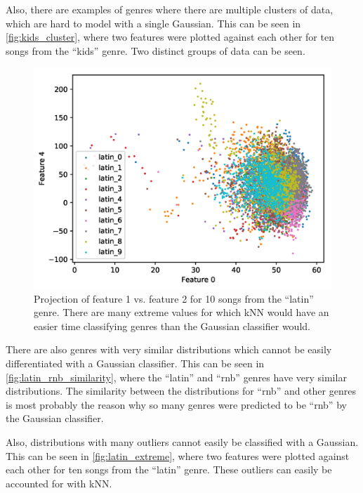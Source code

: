 \documentclass[a4paper,titlepage]{article}
\begin{document}
	Also, there are examples of genres where there are multiple clusters of data, which are hard to model with a single Gaussian. This can be seen in \autoref{fig:kids_cluster}, where two features were plotted against each other for ten songs from the ``kids'' genre. Two distinct groups of data can be seen.
	
	\begin{figure}[!htb]
		\centering
		\includegraphics[width=\columnwidth]{plots/latin_extreme.png}
		\caption
		{Projection of feature 1 vs. feature 2 for 10 songs from the ``latin'' genre. There are many extreme values for which kNN would have an easier time classifying genres than the Gaussian classifier would.}
		\label{fig:latin_extreme}
	\end{figure}

	There are also genres with very similar distributions which cannot be easily differentiated with a Gaussian classifier. This can be seen in \autoref{fig:latin_rnb_similarity}, where the ``latin'' and ``rnb'' genres have very similar distributions. The similarity between the distributions for ``rnb'' and other genres is most probably the reason why so many genres were predicted to be ``rnb'' by the Gaussian classifier.
	
	Also, distributions with many outliers cannot easily be classified with a Gaussian. This can be seen in \autoref{fig:latin_extreme}, where two features were plotted against each other for ten songs from the ``latin'' genre. These outliers can easily be accounted for with kNN.

	
\end{document}
